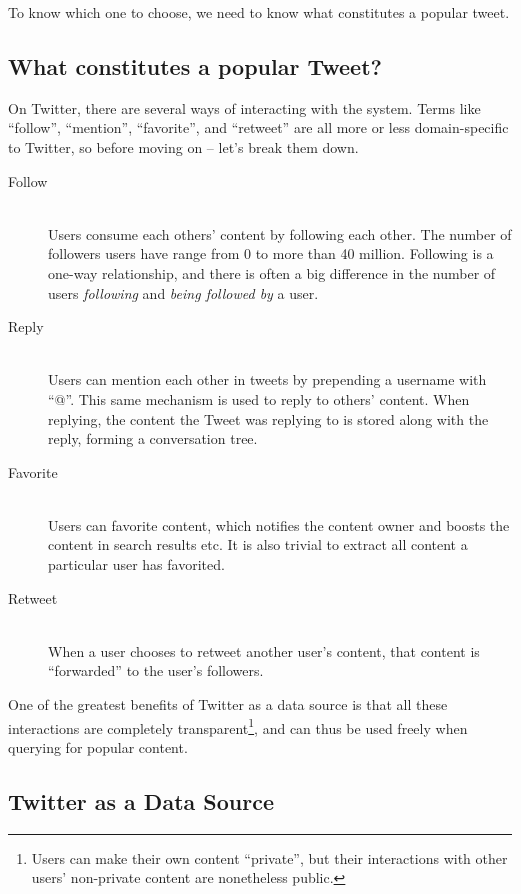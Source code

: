 To know which one to choose, we need to know what constitutes a popular tweet.



\subsection{What constitutes a popular Tweet?}
\label{sub:popular_tweets}

On Twitter, there are several ways of interacting with the system. Terms like ``follow'', ``mention'', ``favorite'', and ``retweet'' are all more or less domain-specific to Twitter, so before moving on -- let's break them down.

\begin{description}
  \item[Follow] \hfill \\
    Users consume each others' content by following each other. The number of followers users have range from 0 to more than 40 million. Following is a one-way relationship, and there is often a big difference in the number of users \emph{following} and \emph{being followed by} a user.
  \item[Reply] \hfill \\
    Users can mention each other in tweets by prepending a username with ``@''. This same mechanism is used to reply to others' content. When replying, the content the Tweet was replying to is stored along with the reply, forming a conversation tree.
  \item[Favorite] \hfill \\
    Users can favorite content, which notifies the content owner and boosts the content in search results etc. It is also trivial to extract all content a particular user has favorited.
  \item[Retweet] \hfill \\
    When a user chooses to retweet another user's content, that content is ``forwarded'' to the user's followers.
\end{description}

One of the greatest benefits of Twitter as a data source is that all these interactions are completely transparent\footnote{Users can make their own content ``private'', but their interactions with other users' non-private content are nonetheless public.}, and can thus be used freely when querying for popular content.


\subsection{Twitter as a Data Source} %
\label{sub:twitter_as_a_data_source}

